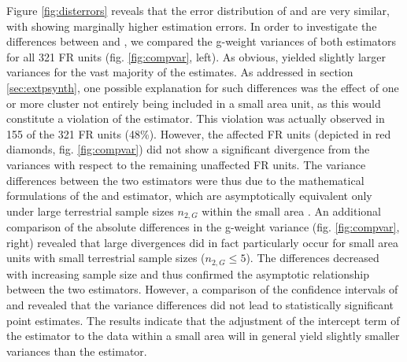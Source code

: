 Figure \ref{fig:disterrors} reveals that the error distribution of \psmall{} and \extpsynth{} are very similar, with \psmall{} showing marginally higher estimation errors. In order to investigate the differences between \psmall{} and \extpsynth{}, we compared the g-weight variances of both estimators for all 321 FR units (fig. \ref{fig:compvar}, left). As obvious, \psmall{} yielded slightly larger variances for the vast majority of the estimates. As addressed in section \ref{sec:extpsynth}, one possible explanation for such differences was the effect of one or more cluster not entirely being included in a small area unit, as this would constitute a violation of the \extpsynth{} estimator. This violation was actually observed in 155 of the 321 FR units (48\%). However, the affected FR units (depicted in red diamonds, fig. \ref{fig:compvar}) did not show a significant divergence from the \psmall{} variances with respect to the remaining unaffected FR units. The variance differences between the two estimators were thus due to the mathematical formulations of the \psmall{} and \extpsynth{} estimator, which are asymptotically equivalent only under large terrestrial sample sizes $n_{2,G}$ within the small area \citep[pp.17--18]{mandallaz2016}. An additional comparison of the absolute differences in the g-weight variance (fig. \ref{fig:compvar}, right) revealed that large divergences did in fact particularly occur for small area units with small terrestrial sample sizes ($n_{2,G} \leq 5$). The differences decreased with increasing sample size and thus confirmed the asymptotic relationship between the two estimators. However, a comparison of the confidence intervals of \psmall{} and \extpsynth{} revealed that the variance differences did not lead to statistically significant point estimates. The results indicate that the adjustment of the intercept term of the \extpsynth{} estimator to the data within a small area will in general yield slightly smaller variances than the \psmall{} estimator.\par



